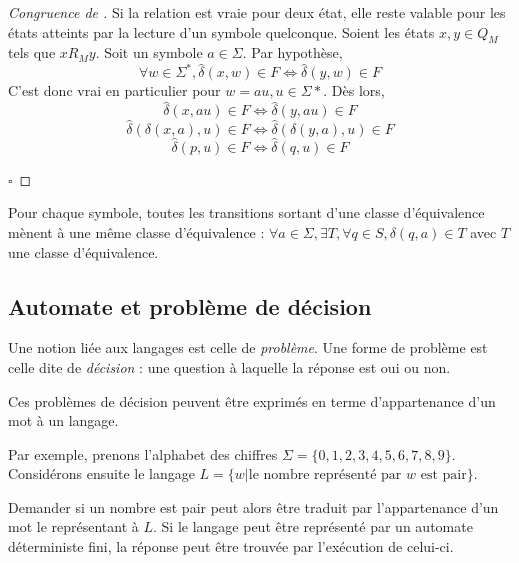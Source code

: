 	 \begin{proof}[Congruence de \rm]
	 	Si la relation est vraie pour deux état, elle reste valable pour les états atteints par la lecture d'un symbole quelconque. Soient les états $x,y \in Q_M$ tels que $xR_My$. Soit un symbole $a \in \Sigma$. Par hypothèse, 
	 	$$\forall w \in \Sigma^*, \hat{\delta}(x, w) \in F \iff \hat{\delta}(y, w) \in F$$
	 	C'est donc vrai en particulier pour $w = au, u \in \Sigma*$. Dès lors,
	 	$$\hat{\delta}(x, au) \in F\iff \hat{\delta}(y, au)\in F$$
	 	$$\hat{\delta}(\delta(x,a),u) \in F\iff\hat{\delta}(\delta(y,a),u)\in F$$
	 	$$\hat{\delta}(p,u) \in F\iff \hat{\delta}(q,u)\in F$$

	\hfill$\square$	 
 \end{proof}
 
 	\begin{corollary}\label{col:st}
 		Pour chaque symbole, toutes les transitions sortant d'une classe d'équivalence mènent à une même classe d'équivalence :
 		$\forall a \in \Sigma, \exists T, \forall q \in S, \delta(q,a)\in T$ avec $T$ une classe d'équivalence.
 	\end{corollary}
	 
	 
	 \subsection{Automate et problème de décision}
	 
	 Une notion liée aux langages est celle de \emph{problème}. Une forme de problème est celle dite de \emph{décision} : une question à laquelle la réponse est oui ou non.
	 
	 Ces problèmes de décision peuvent être exprimés en terme d'appartenance d'un mot à un langage.
	 
	 Par exemple, prenons l'alphabet des chiffres $\Sigma=\{0,1,2,3,4,5,6,7,8,9\}$. Considérons ensuite le langage $L = \{w | \text{le nombre représenté par } w \text{ est pair}\}$.
	 
	 Demander si un nombre est pair peut alors être traduit par l'appartenance d'un mot le représentant à $L$. Si le langage peut être représenté par un automate déterministe fini, la réponse peut être trouvée par l'exécution de celui-ci.
	 
	 
	 
	 